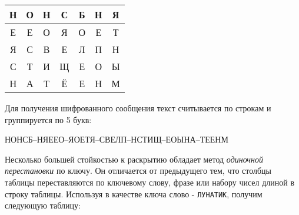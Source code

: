 \begin{table} [htbp]%
  \centering
  \parbox{6cm}{%
    \captiondelim{}%
    \caption{}%
    \label{tabl:tab2x1}%
    \begin{SingleSpace}
      \begin{tabular}{ | c | c | c | c | c | c | c |}
        \hline
          Н & О & Н & С & Б & Н & Я \\ \hline
          Е & Е & О & Я & О & Е & Т \\ \hline
          Я & С & В & Е & Л & П & Н \\ \hline
          С & Т & И & Щ & Е & О & Ы \\ \hline
          Н & А & Т & Ё & Е & Н & М \\ \hline
      \end{tabular}%
    \end{SingleSpace}
  }
\end{table}
Для получения шифрованного сообщения текст считывается по строкам и
группируется по 5 букв:
\begin{center}
НОНСБ--НЯЕЕО--ЯОЕТЯ--СВЕЛП--НСТИЩ--ЕОЫНА--ТЕЕНМ
\end{center}

Несколько большей стойкостью к раскрытию обладает метод \emph{одиночной
перестановки} по ключу. Он отличается от предыдущего тем, что столбцы таблицы
переставляются по ключевому слову, фразе или набору чисел длиной в строку
таблицы. Используя в качестве ключа слово - \texttt{ЛУНАТИК}, получим
следующую таблицу:

